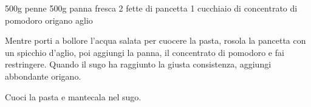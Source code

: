 \begin{ingreds}
	500g penne
	500g panna fresca
	2 fette di pancetta
	1 cucchiaio di concentrato di pomodoro
	origano
	aglio



\end{ingreds}

\begin{method}
Mentre porti a bollore l'acqua salata per cuocere la pasta, rosola la pancetta con un spicchio d'aglio, poi aggiungi la panna, il concentrato di pomodoro e fai restringere. Quando il sugo ha raggiunto la giusta consistenza, aggiungi abbondante origano.

Cuoci la pasta e mantecala nel sugo.


\end{method}




